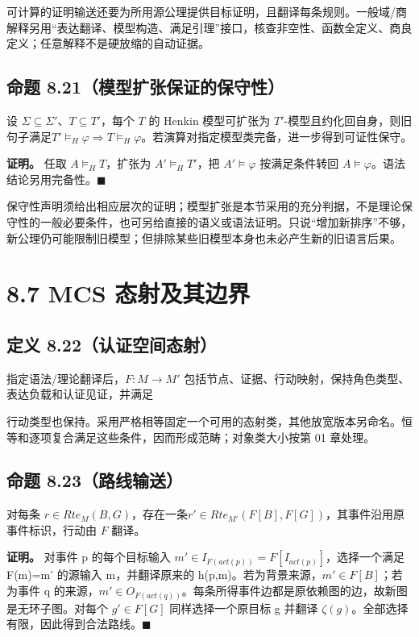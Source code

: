 \documentclass[UTF8,a4paper,zihao=-4,fontset=windows,openany]{ctexbook}
\newcommand{\mcsdisplay}[1]{%
  \par\addvspace{0.7em}%
  \sbox{\mcsmathbox}{\ensuremath{\displaystyle #1}}%
  \ifdim\wd\mcsmathbox>\linewidth
    \noindent\resizebox{\linewidth}{!}{\usebox{\mcsmathbox}}%
  \else
    \noindent\hspace*{\fill}\usebox{\mcsmathbox}\hspace*{\fill}%
  \fi
  \par\addvspace{0.7em}%
}
\def\ensuremath#1{#1}%
\def\mathrm#1{#1}%
\begin{document}
\mcsdisplay{T\models_H\varphi\Rightarrow T'\models_H\sigma(\varphi).}
\noindent 可计算的证明输送还要为所用源公理提供目标证明，且翻译每条规则。一般域/商解释另用“表达翻译、模型构造、满足引理”接口，核查非空性、函数全定义、商良定义；任意解释不是硬放缩的自动证据。

\subsection{命题 8.21（模型扩张保证的保守性）}
设 \(\Sigma\subseteq\Sigma'\)、\(T\subseteq T'\)，每个 \(T\) 的 Henkin 模型可扩张为 \(T'\)-模型且约化回自身，则旧句子满足\(T'\models_H\varphi\Rightarrow T\models_H\varphi\)。若演算对指定模型类完备，进一步得到可证性保守。

\textbf{证明。} 任取 \(A\models_HT\)，扩张为 \(A'\models_HT'\)，把 \(A'\models\varphi\) 按满足条件转回 \(A\models\varphi\)。语法结论另用完备性。\(\blacksquare\)

保守性声明须给出相应层次的证明；模型扩张是本节采用的充分判据，不是理论保守性的一般必要条件，也可另给直接的语义或语法证明。只说“增加新排序”不够，新公理仍可能限制旧模型；但排除某些旧模型本身也未必产生新的旧语言后果。

\section{8.7 MCS 态射及其边界}
\subsection{定义 8.22（认证空间态射）}
指定语法/理论翻译后，\(F:M\to M'\) 包括节点、证据、行动映射，保持角色类型、表达负载和认证见证，并满足


\mcsdisplay{I_{F(a)}=F[I_a],\qquad O_{F(a)}=F[O_a].}
\noindent 行动类型也保持。采用严格相等固定一个可用的态射类，其他放宽版本另命名。恒等和逐项复合满足这些条件，因而形成范畴；对象类大小按第 01 章处理。

\subsection{命题 8.23（路线输送）}
对每条 \(r\in\mathrm{Rte}_M(B,G)\)，存在一条\(r'\in\mathrm{Rte}_{M'}(F[B],F[G])\)，其事件沿用原事件标识，行动由 \(F\) 翻译。

\textbf{证明。} 对事件 p 的每个目标输入 \(m'\in I_{F(\mathrm{act}(p))}=F[I_{\mathrm{act}(p)}]\)，选择一个满足 F(m)=m' 的源输入 m，并翻译原来的 h(p,m)。若为背景来源，\(m'\in F[B]\)；若为事件 q 的来源，\(m'\in O_{F(\mathrm{act}(q))}\)。每条所得事件边都是原依赖图的边，故新图是无环子图。对每个 \(g'\in F[G]\) 同样选择一个原目标 g 并翻译 \(\zeta(g)\)。全部选择有限，因此得到合法路线。\(\blacksquare\)
\end{document}
